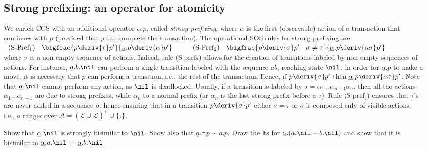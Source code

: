 \subsection{Strong prefixing: an operator for atomicity}

We enrich CCS with an additional operator $\underline{\alpha}.p$, called {\em strong prefixing}, where $\alpha$ 
is the first (observable) action of a transaction that continues with $p$
(provided that $p$ can complete the transaction). The operational SOS rules for strong prefixing are:\\

$\begin{array}{lcllcllcl}
 \mbox{(S-Pref$_1$)}  &  \bigfrac{p\deriv{\tau}p'}{\underline{\alpha}.p\deriv{\alpha}p'} & \quad & 
 \mbox{(S-Pref$_2$)}  & \bigfrac{p\deriv{\sigma}p' \quad \sigma \neq \tau}{\underline{\alpha}.p\deriv{\alpha\sigma}p'} &  \\
\end{array}$\\

\noindent
where $\sigma$ is a non-empty sequence of actions. 
Indeed, rule (S-pref$_2$) allows for the creation of
transitions labeled by non-empty sequences of actions. For instance, $\underline{a}.b.\nil$ can perform a single transition
labeled with the sequence $ab$, reaching state $\nil$. In order for $\underline{\alpha}.p$ to make a move, it is
necessary that $p$ can perform a transition, i.e., the rest of the transaction. Hence, if $p \deriv{\sigma} p'$ then 
$\underline{\alpha}.p \deriv{\alpha\sigma} p'$. Note that $\underline \alpha.\nil$ 
cannot perform any action, as $\nil$ is deadlocked. Usually, if a transition is labeled by 
$\sigma = \alpha_1 \ldots \alpha_{n-1} \alpha_n$, then all the
actions $\alpha_1 \ldots \alpha_{n-1}$ are due to strong prefixes, while $\alpha_n$ to a
normal prefix (or $\alpha_n$ is the last strong prefix before a $\tau$).
Rule (S-pref$_1$) ensures that $\tau$'s are never added in a sequence $\sigma$, hence ensuring that
in a transition $p \deriv{\sigma} p'$ either $\sigma = \tau$ or $\sigma$ is composed only of visible actions,
i.e., $\sigma$ ranges over ${\mathcal A} = (\mathcal{L} \cup \overline{\mathcal L})^+ \cup \{\tau\}$.

\begin{exercise}
Show that $\underline\alpha.\nil$ is strongly bisimilar to $\nil$. Show also that $\underline{a}.\tau.p \sim a.p$.
Draw the lts for $\underline{\alpha}.(a.\nil + b.\nil)$ and show that it
is bisimilar to $\underline{\alpha}.a.\nil \, + \, \underline{\alpha}.b.\nil$.
\fine
\end{exercise}

